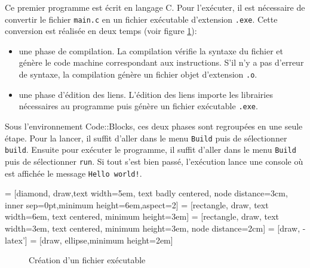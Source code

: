 \documentclass[a4paper,11pt]{book}
\theoremstyle{definition}
\begin{document}


Ce premier programme est écrit en langage C. Pour l'exécuter, il est nécessaire de convertir le fichier  \texttt {main.c} en un fichier exécutable d'extension \texttt{.exe}. Cette  conversion est réalisée en deux temps (voir figure \ref{exe}):
\begin{itemize}
\item une phase de compilation. La compilation vérifie la syntaxe du fichier et génère le code machine correspondant aux instructions. S'il n'y a pas d'erreur de syntaxe, la compilation génère un fichier objet d'extension \texttt{.o}.
\item une phase d'édition des liens. L'édition des liens importe les librairies nécessaires au programme puis génère un fichier exécutable \texttt{.exe}.\\
\end{itemize}
Sous l'environnement Code::Blocks, ces deux phases sont regroupées en une seule étape. Pour la lancer, il suffit d'aller dans le menu \texttt{Build} puis de sélectionner \texttt{build}. Ensuite pour exécuter le programme, il suffit d'aller dans le menu \texttt{Build} puis de sélectionner \texttt{run}. Si tout s'est bien passé, l'exécution lance une console où est affichée le message \texttt{Hello world!}.

 = [diamond, draw,text width=5em, text badly centered, node distance=3cm, inner sep=0pt,minimum height=6em,aspect=2]
 = [rectangle, draw, text width=6em, text centered, minimum height=3em]
 = [rectangle, draw, text width=3em, text centered, minimum height=3em, node distance=2cm]
 = [draw, -latex']
 = [draw, ellipse,minimum height=2em]

\begin{figure}[!h]
\centering
{}
\caption{Création d'un fichier exécutable}\label{exe}
\end{figure}
\end{document}
